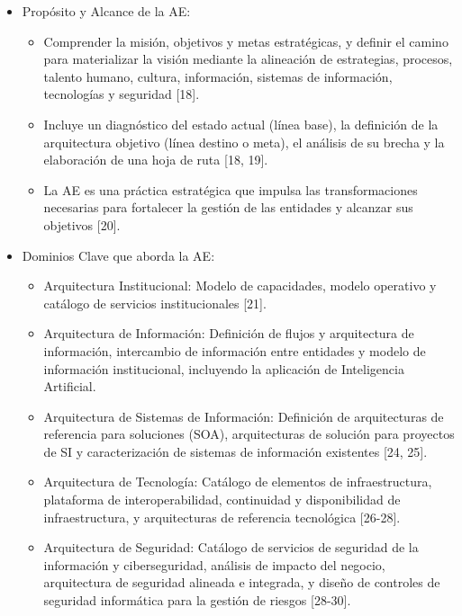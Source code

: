 \documentclass[
	a4paper, %
	12pt, %
]{include/CSSullivanBusinessReport}
\def\tightlist{}
\begin{document}
\begin{itemize}
\tightlist
\item
  Propósito y Alcance de la AE:

  \begin{itemize}
  \tightlist
  \item
    Comprender la misión, objetivos y metas estratégicas, y definir el
    camino para materializar la visión mediante la alineación de
    estrategias, procesos, talento humano, cultura, información,
    sistemas de información, tecnologías y seguridad {[}18{]}.
  \item
    Incluye un diagnóstico del estado actual (línea base), la definición
    de la arquitectura objetivo (línea destino o meta), el análisis de
    su brecha y la elaboración de una hoja de ruta {[}18, 19{]}.
  \item
    La AE es una práctica estratégica que impulsa las transformaciones
    necesarias para fortalecer la gestión de las entidades y alcanzar
    sus objetivos {[}20{]}.
  \end{itemize}
\item
  Dominios Clave que aborda la AE:

  \begin{itemize}
  \tightlist
  \item
    Arquitectura Institucional: Modelo de capacidades, modelo operativo
    y catálogo de servicios institucionales {[}21{]}.
  \item
    Arquitectura de Información: Definición de flujos y arquitectura de
    información, intercambio de información entre entidades y modelo de
    información institucional, incluyendo la aplicación de Inteligencia
    Artificial.
  \item
    Arquitectura de Sistemas de Información: Definición de arquitecturas
    de referencia para soluciones (SOA), arquitecturas de solución para
    proyectos de SI y caracterización de sistemas de información
    existentes {[}24, 25{]}.
  \item
    Arquitectura de Tecnología: Catálogo de elementos de
    infraestructura, plataforma de interoperabilidad, continuidad y
    disponibilidad de infraestructura, y arquitecturas de referencia
    tecnológica {[}26-28{]}.
  \item
    Arquitectura de Seguridad: Catálogo de servicios de seguridad de la
    información y ciberseguridad, análisis de impacto del negocio,
    arquitectura de seguridad alineada e integrada, y diseño de
    controles de seguridad informática para la gestión de riesgos
    {[}28-30{]}.
  \end{itemize}
\end{itemize}
\end{document}
